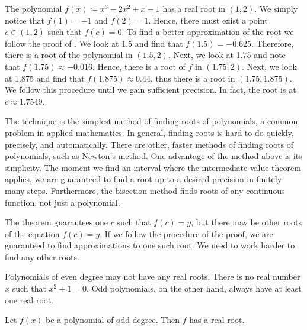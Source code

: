 \begin{example} %
The polynomial $f(x) \coloneqq x^3-2x^2+x-1$ has a real root in $(1,2)$.  We simply
notice that $f(1) = -1$ and $f(2) = 1$.  Hence, there must exist a point $c
\in (1,2)$ such that $f(c) = 0$.  To find a better approximation of
the root we follow the proof of .  
We look at 1.5 and find that $f(1.5) = -0.625$.  Therefore,
there is a root of the polynomial in $(1.5,2)$.  Next, we look at 1.75
and note that $f(1.75) \approx -0.016$.  Hence, there is a root of $f$ in
$(1.75,2)$.  Next, we look at 1.875 and find that $f(1.875) \approx 0.44$,
thus there is a root in $(1.75,1.875)$.  We follow this procedure until we gain
sufficient precision.  In fact, the root is at $c \approx 1.7549$.
\end{example}

The technique is the simplest method of finding roots of polynomials,
a common problem in applied mathematics.
In general, finding roots is hard to do quickly, precisely,
and automatically.
There are other, faster methods of finding roots of polynomials, such
as Newton's method.  One advantage of the method above is its
simplicity.  The
moment we find an interval where the intermediate value theorem
applies, we are guaranteed to find a root up to a desired
precision in finitely many steps.  Furthermore, the bisection
method finds roots of any
continuous function, not just a polynomial.

The theorem guarantees one $c$ such that $f(c) = y$, but there
may be other roots of the equation $f(c) = y$.  If we follow
the procedure of the proof, we are guaranteed to find approximations to
one such root.  We need to work harder to find any other roots.

\medskip

Polynomials of even degree may not have any real roots.
There is no real number $x$ such that $x^2+1 = 0$.  Odd polynomials, on the
other hand, always have at least one real root.

\begin{prop}
Let $f(x)$ be a polynomial of odd degree.  Then $f$ has a real root.
\end{prop}

